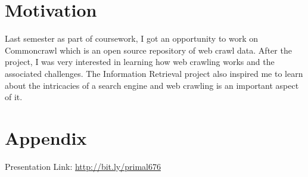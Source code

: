 \documentclass[a4paper, 11pt]{article} %
\begin{document}
\section*{Motivation}

Last semester as part of coursework, I got an opportunity to work on Commoncrawl \cite{commoncrawl2012} which is an open source repository of web crawl data. After the project, I was very interested in learning how web crawling works and the associated challenges. The Information Retrieval project also inspired me to learn about the intricacies of a search engine and web crawling is an important aspect of it.

\section*{Appendix}

Presentation Link: \url{http://bit.ly/primal676}







\end{document}
